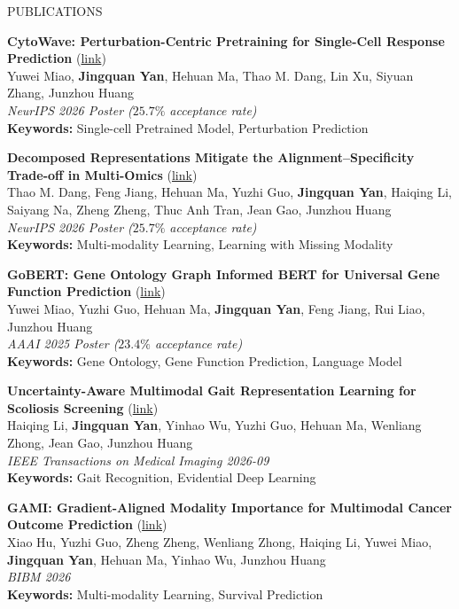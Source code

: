 \documentclass{resume} %
\begin{document}
\begin{rSection}{PUBLICATIONS}
\begin{enumerate}[label={[\arabic*]}]
    \item \textbf{CytoWave: Perturbation-Centric Pretraining for Single-Cell Response Prediction} (\href{https://TODO_after_camera_ready}{link}) \hfill \\
  Yuwei Miao, \textbf{Jingquan Yan}, Hehuan Ma, Thao M. Dang, Lin Xu, Siyuan Zhang, Junzhou Huang\hfill \\
  \textit{NeurIPS 2026 Poster ($25.7\%$ acceptance rate)} \\
  \textbf{Keywords:} Single-cell Pretrained Model, Perturbation Prediction   

        \item \textbf{Decomposed Representations Mitigate the Alignment–Specificity Trade-off in Multi-Omics} (\href{https://TODO_after_camera_ready}{link}) \hfill \\
  Thao M. Dang, Feng Jiang, Hehuan Ma, Yuzhi Guo, \textbf{Jingquan Yan}, Haiqing Li, Saiyang Na, Zheng Zheng, Thuc Anh Tran, Jean Gao, Junzhou Huang\hfill \\
  \textit{NeurIPS 2026 Poster ($25.7\%$ acceptance rate)} \\
  \textbf{Keywords:} Multi-modality Learning, Learning with Missing Modality

      \item \textbf{GoBERT: Gene Ontology Graph Informed BERT for Universal Gene Function Prediction} (\href{https://ojs.aaai.org/index.php/AAAI/article/view/32043}{link}) \hfill \\
  Yuwei Miao, Yuzhi Guo, Hehuan Ma, \textbf{Jingquan Yan}, Feng Jiang, Rui Liao, Junzhou Huang \hfill \\
  \textit{AAAI 2025 Poster ($23.4\%$ acceptance rate)}\\
    \textbf{Keywords:} Gene Ontology, Gene Function Prediction, Language Model
  
      \item \textbf{Uncertainty-Aware Multimodal Gait Representation Learning for Scoliosis Screening} (\href{https://TODO_after_camera_ready}{link}) \hfill \\
  Haiqing Li, \textbf{Jingquan Yan}, Yinhao Wu, Yuzhi Guo, Hehuan Ma, Wenliang Zhong, Jean Gao, Junzhou Huang\hfill \\
  \textit{IEEE Transactions on Medical Imaging 2026-09} \\
  \textbf{Keywords:} Gait Recognition, Evidential Deep Learning

  
      \item \textbf{GAMI: Gradient-Aligned Modality Importance for Multimodal Cancer Outcome Prediction} (\href{https://TODO_after_camera_ready}{link}) \hfill \\
  Xiao Hu, Yuzhi Guo, Zheng Zheng, Wenliang Zhong, Haiqing Li, Yuwei Miao, \textbf{Jingquan Yan}, Hehuan Ma, Yinhao Wu, Junzhou Huang\hfill \\
  \textit{BIBM 2026} \\
  \textbf{Keywords:} Multi-modality Learning, Survival Prediction


\end{enumerate}
\end{rSection}
\end{document}
